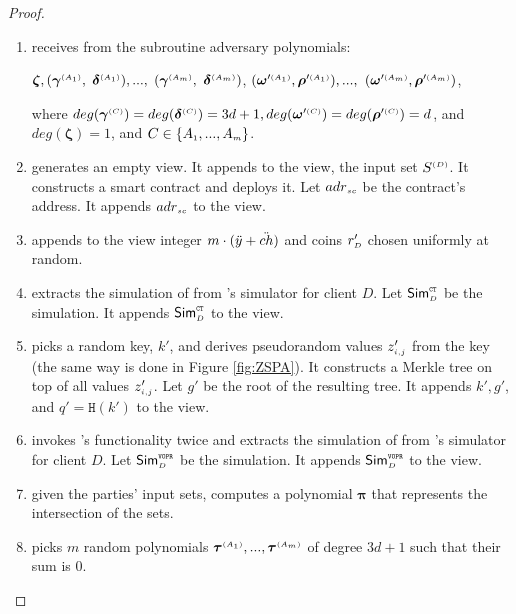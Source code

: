 \begin{proof}
\begin{enumerate}

\item receives from the subroutine adversary polynomials:

 $ {\bm\zeta}, ( {\bm\gamma}^{\scriptscriptstyle(A_1)},$ $  {\bm\delta}^{\scriptscriptstyle (A_1)}),...,$ $ ( {\bm\gamma}^{\scriptscriptstyle(A_m)}, $ $ {\bm\delta}^{\scriptscriptstyle (A_m)})$,  $( {\bm\omega}'^{\scriptscriptstyle (A_1)},  {\bm\rho}'^{\scriptscriptstyle (A_1)}),..., $ $( {\bm\omega}'^{\scriptscriptstyle (A_m)},  {\bm\rho}'^{\scriptscriptstyle (A_m)})$,
 
  where $deg( {\bm\gamma}^{\scriptscriptstyle(C)})=deg( {\bm\delta}^{\scriptscriptstyle(C)})=3d+1,  deg( {\bm\omega}'^{\scriptscriptstyle (C)}) = deg( {\bm\rho}'^{\scriptscriptstyle (C)})= d$, and $deg( {\bm\zeta})=1$, and $C\in  \{  {  A}_{ \scriptscriptstyle {   1}}, ...,   {  A}_{ \scriptscriptstyle {   m}}\} $.
%
\item generates an empty view. It appends to the view, the input set $S^{\scriptscriptstyle (D)}$. It constructs a smart contract  and deploys it. Let $  {adr}_{\scriptscriptstyle sc}$ be the contract's address. It appends $ {adr}_{\scriptscriptstyle sc}$ to the view. 


\item appends to the view integer $m\cdot(\ddot{y}+\ddot{ch})$   and coins $r'_{\scriptscriptstyle D}$ chosen uniformly at random. 
%
\item extracts the simulation of \ct from \ct's simulator for client $D$. Let $\mathsf{Sim}^{\scriptscriptstyle \mathtt{CT}}_{\scriptscriptstyle D}$ be the simulation. It appends $\mathsf{Sim}^{\scriptscriptstyle \mathtt{CT}}_{\scriptscriptstyle D}$ to the view. 
%
\item picks a random key, $  k'$, and derives pseudorandom values $z'_{\scriptscriptstyle i,j}$ from the key (the same way is done in Figure \ref{fig:ZSPA}). It constructs a Merkle tree on top of all values $z'_{\scriptscriptstyle i, j}$. Let $g'$ be the root of the resulting tree. It appends $  k', g'$, and $q'=\mathtt{H}(  k')$ to the view. 
%
\item invokes \vopr's functionality twice and extracts the simulation of \vopr from \vopr's simulator for client $D$. Let $\mathsf{Sim}^{\scriptscriptstyle \mathtt{VOPR}}_{\scriptscriptstyle D}$ be the simulation. It appends $\mathsf{Sim}^{\scriptscriptstyle \mathtt{VOPR}}_{\scriptscriptstyle D}$ to the view.  
%
\item given the parties' input sets, computes a polynomial $ {\bm\pi}$ that represents the intersection of the sets. 

\item picks $m$ random polynomials $ {\bm\tau}^{\scriptscriptstyle (A_1)}, ...,  {\bm\tau}^{\scriptscriptstyle (A_m)}$ of degree $3d+1$ such that their sum is $0$.  



\end{enumerate}
\end{proof}
